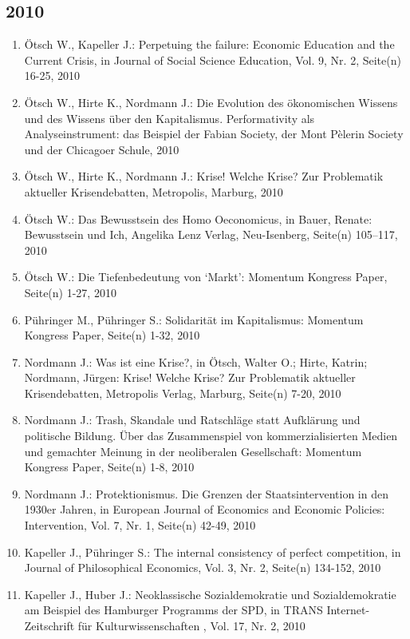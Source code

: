 \subsection*{2010}
\begin{enumerate}
    	 \item Ötsch W., Kapeller J.: Perpetuing the failure: Economic Education and the Current Crisis, in Journal of Social Science Education, Vol. 9, Nr. 2, Seite(n) 16-25, 2010
	 \item Ötsch W., Hirte K., Nordmann J.: Die Evolution des ökonomischen Wissens und des Wissens über den Kapitalismus. Performativity als Analyseinstrument: das Beispiel der Fabian Society, der Mont Pèlerin Society und der Chicagoer Schule, 2010
	 \item Ötsch W., Hirte K., Nordmann J.: Krise! Welche Krise? Zur Problematik aktueller Krisendebatten, Metropolis, Marburg, 2010
	 \item Ötsch W.: Das Bewusstsein des Homo Oeconomicus, in Bauer, Renate: Bewusstsein und Ich, Angelika Lenz Verlag, Neu-Isenberg, Seite(n) 105–117, 2010
	 \item Ötsch W.: Die Tiefenbedeutung von ‘Markt’: Momentum Kongress Paper, Seite(n) 1-27, 2010
	 \item Pühringer M., Pühringer S.: Solidarität im Kapitalismus: Momentum Kongress Paper, Seite(n) 1-32, 2010
	 \item Nordmann J.: Was ist eine Krise?, in Ötsch, Walter O.; Hirte, Katrin; Nordmann, Jürgen: Krise! Welche Krise? Zur Problematik aktueller Krisendebatten, Metropolis Verlag, Marburg, Seite(n) 7-20, 2010
	 \item Nordmann J.: Trash, Skandale und Ratschläge statt Aufklärung und politische Bildung. Über das Zusammenspiel von kommerzialisierten Medien und gemachter Meinung in der neoliberalen Gesellschaft: Momentum Kongress Paper, Seite(n) 1-8, 2010
	 \item Nordmann J.: Protektionismus. Die Grenzen der Staatsintervention in den 1930er Jahren, in European Journal of Economics and Economic Policies: Intervention, Vol. 7, Nr. 1, Seite(n) 42-49, 2010
	 \item Kapeller J., Pühringer S.: The internal consistency of perfect competition, in Journal of Philosophical Economics, Vol. 3, Nr. 2, Seite(n) 134-152, 2010
	 \item Kapeller J., Huber J.: Neoklassische Sozialdemokratie und Sozialdemokratie am Beispiel des Hamburger Programms der SPD, in TRANS Internet-Zeitschrift für Kulturwissenschaften , Vol. 17, Nr. 2, 2010

\end{enumerate}
